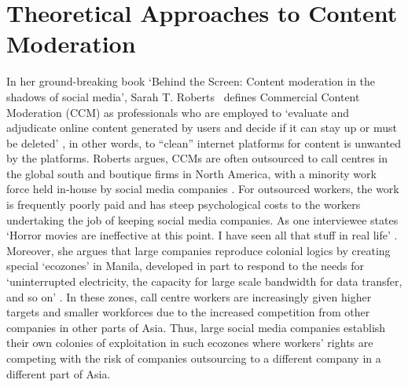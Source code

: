 
\section{Theoretical Approaches to Content Moderation}
In her ground-breaking book `Behind the Screen: Content moderation in the shadows of social media', Sarah T. Roberts~\citeyear{Roberts:2019} defines Commercial Content Moderation (CCM) as professionals who are employed to `evaluate and adjudicate online content generated by users and decide if it can stay up or must be deleted' \citep[p. 1]{Roberts:2019}, in other words, to ``clean'' internet platforms for content is unwanted by the platforms.
Roberts argues, CCMs are often outsourced to call centres in the global south and boutique firms in North America, with a minority work force held in-house by social media companies \citep{Roberts:2019}.
For outsourced workers, the work is frequently poorly paid and has steep psychological costs to the workers undertaking the job of keeping social media companies.
As one interviewee states `Horror movies are ineffective at this point.
I have seen all that stuff in real life' \citep[p. 122]{Roberts:2019}.
Moreover, she argues that large companies reproduce colonial logics by creating special `ecozones' in Manila, developed in part to respond to the needs for `uninterrupted electricity, the capacity for large scale bandwidth for data transfer, and so on' \citep[p. 183]{Roberts:2019}.
In these zones, call centre workers are increasingly given higher targets and smaller workforces \citep[p. 178]{Roberts:2019} due to the increased competition from other companies in other parts of Asia.
Thus, large social media companies establish their own colonies of exploitation in such ecozones where workers' rights are competing with the risk of companies outsourcing to a different company in a different part of Asia.

